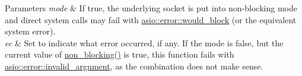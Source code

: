 \begin{DoxyParams}{Parameters}
{\em mode} & If {\ttfamily true}, the underlying socket is put into non-\/blocking mode and direct system calls may fail with \hyperlink{namespaceasio_1_1error_a2a69445eee784059ac2f4a6c4f5fe90da8e8ff1984495eb85ec17c37e3e5a89e5}{asio\+::error\+::would\+\_\+block} (or the equivalent system error).\\
\hline
{\em ec} & Set to indicate what error occurred, if any. If the {\ttfamily mode} is {\ttfamily false}, but the current value of {\ttfamily \hyperlink{classasio_1_1basic__socket_ae8881aa0b691d6be1f71424140cf84e7}{non\+\_\+blocking()}} is {\ttfamily true}, this function fails with \hyperlink{namespaceasio_1_1error_a2a69445eee784059ac2f4a6c4f5fe90da30cedfce8621ca9c21dddce0ac27cd09}{asio\+::error\+::invalid\+\_\+argument}, as the combination does not make sense.\\
\hline
\end{DoxyParams}
